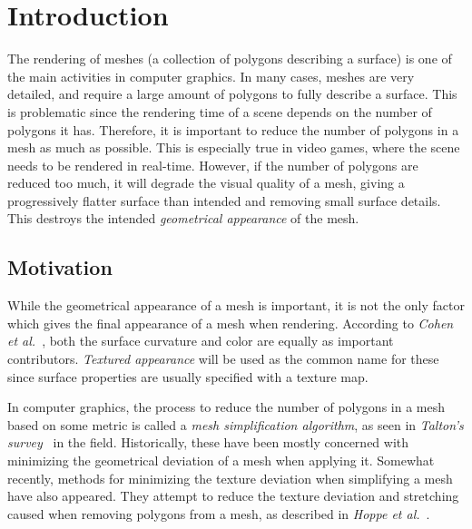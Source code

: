 

\chapter{Introduction} \label{cha:introduction}
The rendering of meshes (a collection of polygons describing a surface) is one of the main activities in computer graphics. In many cases, meshes are very detailed, and require a large amount of polygons to fully describe a surface. This is problematic since the rendering time of a scene depends on the number of polygons it has. Therefore, it is important to reduce the number of polygons in a mesh as much as possible. This is especially true in video games, where the scene needs to be rendered in real-time. However, if the number of polygons are reduced too much, it will degrade the visual quality of a mesh, giving a progressively flatter surface than intended and removing small surface details. This destroys the intended \emph{geometrical appearance} of the mesh.


\section{Motivation} \label{sec:motivation}
While the geometrical appearance of a mesh is important, it is not the only factor which gives the final appearance of a mesh when rendering. According to \emph{Cohen et al.}~\cite{cohen1998appearance}, both the surface curvature and color are equally as important contributors. \emph{Textured appearance} will be used as the common name for these since surface properties are usually specified with a texture map.

In computer graphics, the process to reduce the number of polygons in a mesh based on some metric is called a \emph{mesh simplification algorithm}, as seen in \emph{Talton's survey}~\cite{talton2004short} in the field. Historically, these have been mostly concerned with minimizing the geometrical deviation of a mesh when applying it. Somewhat recently, methods for minimizing the texture deviation when simplifying a mesh have also appeared. They attempt to reduce the texture deviation and stretching caused when removing polygons from a mesh, as described in \emph{Hoppe et al.}~\cite{hoppe1996progressive}.


